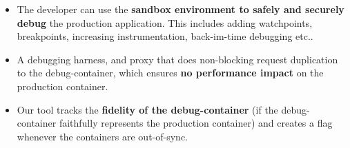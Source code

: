 \begin{itemize}[leftmargin=*]

 \item The developer can use the \textbf{sandbox environment to  safely and securely debug} the production application.
 This includes adding watchpoints, breakpoints, increasing instrumentation, back-im-time debugging  etc..  

 \item A debugging harness, and proxy that does non-blocking request duplication to the debug-container, which ensures \textbf{no performance impact} on the production container. 

 \item Our tool tracks the \textbf{fidelity of the debug-container} (if the debug-container faithfully represents the production container) and creates a flag whenever the containers are out-of-sync.



\end{itemize}


